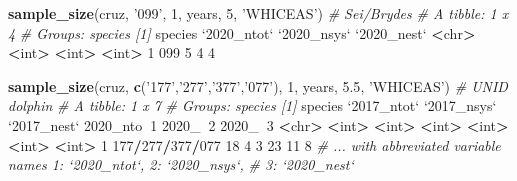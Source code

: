\documentclass[
]{book}
\newenvironment{Shaded}{\begin{snugshade}}{\end{snugshade}}
\newcommand{\CommentTok}[1]{\textcolor[rgb]{0.56,0.35,0.01}{\textit{#1}}}
\newcommand{\DataTypeTok}[1]{\textcolor[rgb]{0.13,0.29,0.53}{#1}}
\newcommand{\DecValTok}[1]{\textcolor[rgb]{0.00,0.00,0.81}{#1}}
\newcommand{\ErrorTok}[1]{\textcolor[rgb]{0.64,0.00,0.00}{\textbf{#1}}}
\newcommand{\FloatTok}[1]{\textcolor[rgb]{0.00,0.00,0.81}{#1}}
\newcommand{\KeywordTok}[1]{\textcolor[rgb]{0.13,0.29,0.53}{\textbf{#1}}}
\newcommand{\NormalTok}[1]{#1}
\newcommand{\OperatorTok}[1]{\textcolor[rgb]{0.81,0.36,0.00}{\textbf{#1}}}
\newcommand{\StringTok}[1]{\textcolor[rgb]{0.31,0.60,0.02}{#1}}
\begin{document}
\begin{Shaded}
\begin{Highlighting}[]
\KeywordTok{sample_size}\NormalTok{(cruz, }\StringTok{'099'}\NormalTok{, }\DecValTok{1}\NormalTok{, years, }\DecValTok{5}\NormalTok{, }\StringTok{'WHICEAS'}\NormalTok{) }\CommentTok{# Sei/Brydes}
\CommentTok{# A tibble: 1 x 4}
\CommentTok{# Groups:   species [1]}
\NormalTok{  species }\StringTok{`}\DataTypeTok{2020_ntot}\StringTok{`} \StringTok{`}\DataTypeTok{2020_nsys}\StringTok{`} \StringTok{`}\DataTypeTok{2020_nest}\StringTok{`}
  \OperatorTok{<}\NormalTok{chr}\OperatorTok{>}\StringTok{         }\ErrorTok{<}\NormalTok{int}\OperatorTok{>}\StringTok{       }\ErrorTok{<}\NormalTok{int}\OperatorTok{>}\StringTok{       }\ErrorTok{<}\NormalTok{int}\OperatorTok{>}
\DecValTok{1} \DecValTok{099}               \DecValTok{5}           \DecValTok{4}           \DecValTok{4}

\KeywordTok{sample_size}\NormalTok{(cruz, }\KeywordTok{c}\NormalTok{(}\StringTok{'177'}\NormalTok{,}\StringTok{'277'}\NormalTok{,}\StringTok{'377'}\NormalTok{,}\StringTok{'077'}\NormalTok{), }
            \DecValTok{1}\NormalTok{, years, }\FloatTok{5.5}\NormalTok{, }\StringTok{'WHICEAS'}\NormalTok{) }\CommentTok{# UNID dolphin}
\CommentTok{# A tibble: 1 x 7}
\CommentTok{# Groups:   species [1]}
\NormalTok{  species         }\StringTok{`}\DataTypeTok{2017_ntot}\StringTok{`} \StringTok{`}\DataTypeTok{2017_nsys}\StringTok{`} \StringTok{`}\DataTypeTok{2017_nest}\StringTok{`} \DecValTok{2020}\NormalTok{_nto}\OperatorTok{~}\DecValTok{1} \DecValTok{2020}\NormalTok{_}\OperatorTok{~}\DecValTok{2} \DecValTok{2020}\NormalTok{_}\OperatorTok{~}\DecValTok{3}
  \OperatorTok{<}\NormalTok{chr}\OperatorTok{>}\StringTok{                 }\ErrorTok{<}\NormalTok{int}\OperatorTok{>}\StringTok{       }\ErrorTok{<}\NormalTok{int}\OperatorTok{>}\StringTok{       }\ErrorTok{<}\NormalTok{int}\OperatorTok{>}\StringTok{      }\ErrorTok{<}\NormalTok{int}\OperatorTok{>}\StringTok{   }\ErrorTok{<}\NormalTok{int}\OperatorTok{>}\StringTok{   }\ErrorTok{<}\NormalTok{int}\OperatorTok{>}
\DecValTok{1} \DecValTok{177}\OperatorTok{/}\DecValTok{277}\OperatorTok{/}\DecValTok{377}\OperatorTok{/}\DecValTok{077}          \DecValTok{18}           \DecValTok{4}           \DecValTok{3}         \DecValTok{23}      \DecValTok{11}       \DecValTok{8}
\CommentTok{# ... with abbreviated variable names 1: `2020_ntot`, 2: `2020_nsys`,}
\CommentTok{#   3: `2020_nest`}


\end{Highlighting}
\end{Shaded}
\end{document}
